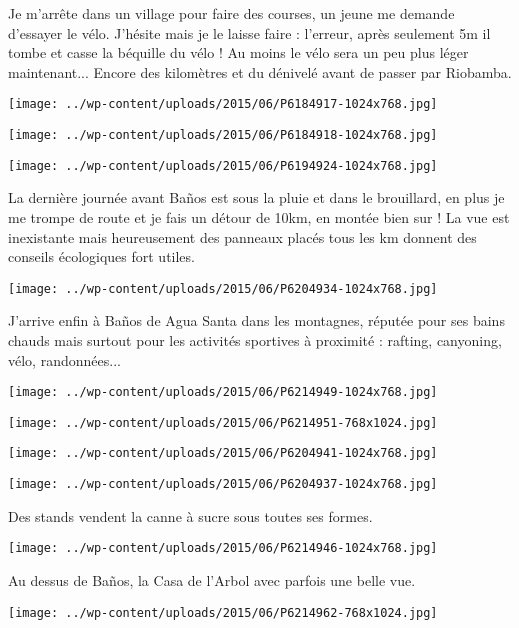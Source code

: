 Je m'arrête dans un village pour faire des courses, un jeune me demande d'essayer le vélo. J'hésite mais je le laisse faire : l'erreur, après seulement 5m il tombe et casse la béquille du vélo ! Au moins le vélo sera un peu plus léger maintenant...
Encore des kilomètres et du dénivelé avant de passer par Riobamba. 
\begin{center} \texttt{[image: ../wp-content/uploads/2015/06/P6184917-1024x768.jpg]} \end{center}
\begin{center} \texttt{[image: ../wp-content/uploads/2015/06/P6184918-1024x768.jpg]} \end{center}
\begin{center} \texttt{[image: ../wp-content/uploads/2015/06/P6194924-1024x768.jpg]} \end{center}
\pagebreak

La dernière journée avant Baños est sous la pluie et dans le brouillard, en plus je me trompe de route et je fais un détour de 10km, en montée bien sur ! La vue est inexistante mais heureusement des panneaux placés tous les km donnent des conseils écologiques fort utiles. 
\begin{center} \texttt{[image: ../wp-content/uploads/2015/06/P6204934-1024x768.jpg]} \end{center}

J'arrive enfin à Baños de Agua Santa dans les montagnes, réputée pour ses bains chauds mais surtout pour les activités sportives à proximité : rafting, canyoning, vélo, randonnées... 
\begin{center} \texttt{[image: ../wp-content/uploads/2015/06/P6214949-1024x768.jpg]} \end{center}
\begin{center} \texttt{[image: ../wp-content/uploads/2015/06/P6214951-768x1024.jpg]} \end{center}
\begin{center} \texttt{[image: ../wp-content/uploads/2015/06/P6204941-1024x768.jpg]} \end{center}
\begin{center} \texttt{[image: ../wp-content/uploads/2015/06/P6204937-1024x768.jpg]} \end{center}

Des stands vendent la canne à sucre sous toutes ses formes. 
\begin{center} \texttt{[image: ../wp-content/uploads/2015/06/P6214946-1024x768.jpg]} \end{center}
\pagebreak

Au dessus de Baños, la Casa de l'Arbol avec parfois une belle vue. 
\begin{center} \texttt{[image: ../wp-content/uploads/2015/06/P6214962-768x1024.jpg]} \end{center}